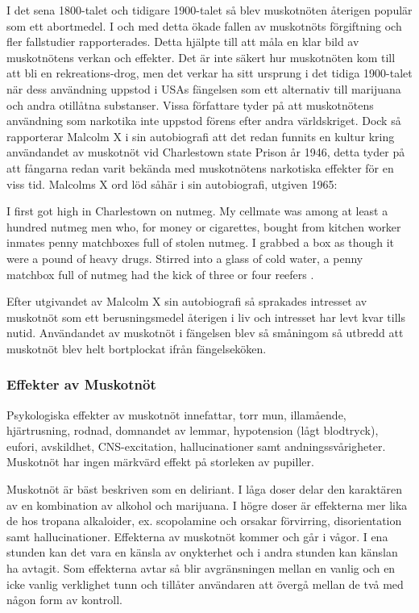 I det sena 1800-talet och tidigare 1900-talet så blev muskotnöten återigen populär som ett
abortmedel. I och med detta ökade fallen av muskotnöts förgiftning och fler fallstudier rapporterades.
Detta hjälpte till att måla en klar bild av muskotnötens verkan och effekter.
Det är inte säkert hur muskotnöten kom till att bli en rekreations-drog, men det verkar ha sitt
ursprung i det tidiga 1900-talet när dess användning uppstod i USAs fängelsen som ett alternativ
till marijuana och andra otillåtna substanser.
Vissa författare tyder på att muskotnötens användning som narkotika inte uppstod förens efter
andra världskriget. Dock så rapporterar Malcolm X i sin autobiografi att det redan funnits en kultur kring
användandet av muskotnöt vid Charlestown state Prison år 1946, detta tyder på att fångarna redan
varit bekända med muskotnötens narkotiska effekter för en viss tid.
Malcolms X ord löd såhär i sin autobiografi, utgiven 1965:
\begin{displayquote}

I first got high in Charlestown on nutmeg. My cellmate was among at least a
hundred nutmeg men who, for money or cigarettes, bought from kitchen worker
inmates penny matchboxes full of stolen nutmeg. I grabbed a box as though it
were a pound of heavy drugs. Stirred into a glass of cold water, a penny
matchbox full of nutmeg had the kick of three or four reefers \cite{malcolmx}.

\end{displayquote}

Efter utgivandet av Malcolm X sin autobiografi så sprakades intresset av muskotnöt som ett
berusningsmedel återigen i liv och intresset har levt kvar tills nutid.
Användandet av muskotnöt i fängelsen blev så småningom så utbredd att muskotnöt blev
helt bortplockat ifrån fängelseköken.




\subsubsection{Effekter av Muskotnöt}

Psykologiska effekter av muskotnöt innefattar, torr mun, illamående, hjärtrusning, rodnad,
domnandet av lemmar, hypotension (lågt blodtryck), eufori, avskildhet, CNS-excitation,
hallucinationer samt andningssvårigheter.
Muskotnöt har ingen märkvärd effekt på storleken av pupiller. \cite{entheogenreview}

Muskotnöt är bäst beskriven som en deliriant. I låga doser delar den karaktären av en kombination av alkohol och marijuana. I högre doser är effekterna mer lika de hos tropana alkaloider, ex. scopolamine och orsakar förvirring, disorientation samt hallucinationer.
Effekterna av muskotnöt kommer och går i vågor. I ena stunden kan det vara en känsla av onykterhet och i andra stunden kan känslan ha avtagit.
Som effekterna avtar så blir avgränsningen mellan en vanlig och en icke vanlig verklighet tunn och tillåter användaren att övergå mellan de två med någon form av kontroll.

